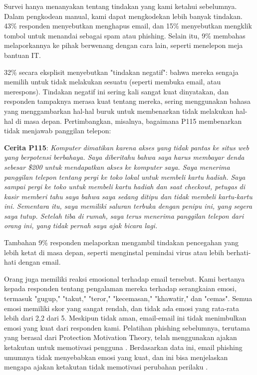 \documentclass[lettersize,journal]{IEEEtran}
\begin{document}
Survei hanya menanyakan tentang tindakan yang kami ketahui sebelumnya. Dalam
pengkodean manual, kami dapat mengkodekan lebih banyak tindakan. 43\% responden
menyebutkan menghapus email, dan 15\% menyebutkan mengklik tombol untuk
menandai sebagai spam atau phishing. Selain itu, 9\% membahas melaporkannya ke
pihak berwenang dengan cara lain, seperti menelepon meja bantuan IT.

32\% secara eksplisit menyebutkan "tindakan negatif": bahwa mereka
sengaja memilih untuk tidak melakukan sesuatu (seperti membuka email,
atau merespons). Tindakan negatif ini sering kali sangat kuat
dinyatakan, dan responden tampaknya merasa kuat tentang mereka,
sering menggunakan bahasa yang menggambarkan hal-hal buruk untuk membenarkan tidak melakukan
hal-hal di masa depan. Pertimbangkan, misalnya, bagaimana P115 membenarkan
tidak menjawab panggilan telepon:

\textbf{Cerita P115}: \textit{Komputer dimatikan karena akses yang tidak pantas ke situs web yang berpotensi berbahaya. Saya diberitahu bahwa saya harus membayar denda sebesar \$200 untuk mendapatkan akses ke komputer saya. Saya menerima panggilan telepon tentang pergi ke toko lokal untuk membeli kartu hadiah. Saya sampai pergi ke toko untuk membeli kartu hadiah dan saat checkout, petugas di kasir memberi tahu saya bahwa saya sedang ditipu dan tidak membeli kartu-kartu ini. Sementara itu, saya memiliki saluran terbuka dengan penipu ini, yang segera saya tutup. Setelah tiba di rumah, saya terus menerima panggilan telepon dari orang ini, yang tidak pernah saya ajak bicara lagi.}

Tambahan 9\% responden melaporkan mengambil tindakan pencegahan yang lebih
ketat di masa depan, seperti menginstal pemindai virus atau lebih berhati-hati
dengan email.

Orang juga memiliki reaksi emosional terhadap email tersebut. Kami bertanya
kepada responden tentang pengalaman mereka terhadap serangkaian emosi, termasuk
"gugup," "takut," "teror," "kecemasan," "khawatir," dan "cemas". Semua emosi
memiliki skor yang sangat rendah, dan tidak ada emosi yang rata-rata lebih dari
2,2 dari 5. Meskipun tidak aman, email-email ini tidak menimbulkan emosi yang
kuat dari responden kami. Pelatihan phishing sebelumnya, terutama yang berasal
dari Protection Motivation Theory, telah menggunakan ajakan ketakutan untuk
memotivasi pengguna \cite{lima,duanol}. Berdasarkan data ini, email phishing
umumnya tidak menyebabkan emosi yang kuat, dan ini bisa menjelaskan mengapa
ajakan ketakutan tidak memotivasi perubahan perilaku \cite{enam}.
\end{document}
